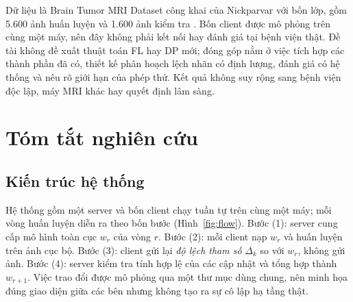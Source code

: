 \documentclass[12pt,a4paper]{report}
\begin{document}
Dữ liệu là Brain Tumor MRI Dataset công khai của Nickparvar với bốn lớp, gồm 5.600 ảnh huấn luyện và 1.600 ảnh kiểm tra \citep{dataset}. Bốn client được mô phỏng trên cùng một máy, nên đây không phải kết nối hay đánh giá tại bệnh viện thật. Đề tài không đề xuất thuật toán FL hay DP mới; đóng góp nằm ở việc tích hợp các thành phần đã có, thiết kế phân hoạch lệch nhãn có định lượng, đánh giá có hệ thống và nêu rõ giới hạn của phép thử. Kết quả không suy rộng sang bệnh viện độc lập, máy MRI khác hay quyết định lâm sàng.

\chapter{Tóm tắt nghiên cứu}
\section{Kiến trúc hệ thống}
Hệ thống gồm một server và bốn client chạy tuần tự trên cùng một máy; mỗi vòng huấn luyện diễn ra theo bốn bước (Hình~\ref{fig:flow}). Bước (1): server cung cấp mô hình toàn cục $w_r$ của vòng $r$. Bước (2): mỗi client nạp $w_r$ và huấn luyện trên ảnh cục bộ. Bước (3): client gửi lại \emph{độ lệch tham số} $\Delta_k$ so với $w_r$, không gửi ảnh. Bước (4): server kiểm tra tính hợp lệ của các cập nhật và tổng hợp thành $w_{r+1}$. Việc trao đổi được mô phỏng qua một thư mục dùng chung, nên minh họa đúng giao diện giữa các bên nhưng không tạo ra sự cô lập hạ tầng thật.
\end{document}
